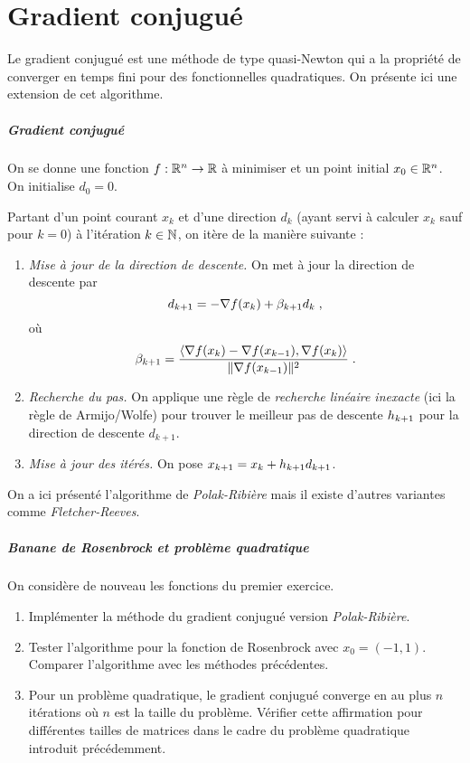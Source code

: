 \documentclass[a4paper,french,12pt]{article}
\begin{document}
\section{Gradient conjugué}
%
Le gradient conjugué est une méthode de type quasi-Newton qui a la
propriété de converger en temps fini pour des fonctionnelles
quadratiques. On présente ici une extension de cet algorithme.
\subparagraph{Gradient conjugué}
On se donne une fonction $f : \mathbb{R}^n \to \mathbb{R}$ à minimiser et un point initial $x_0 \in \mathbb{R}^n$. On initialise $d_0 = 0$.

Partant d'un point courant $x_k$ et d'une direction $d_k$ (ayant servi à  calculer $x_k$ sauf pour $k=0$) à
l'itération $k \in \mathbb{N}$, on itère de la manière suivante :
\begin{enumerate}
\item \textit{Mise à jour de la direction de descente.}  On met à jour la direction de descente par
  \begin{equation*}
    d_{k+1} = -\nabla f(x_k) + \beta_{k+1} d_k \;,
  \end{equation*}
  où
  \begin{equation*}
   \beta_{k+1} = \frac{\langle \nabla f(x_{k}) - \nabla f(x_{k-1}), \nabla f(x_{k}) \rangle}{\| \nabla f(x_{k-1}) \|^2}  \;.
  \end{equation*}
\item \textit{Recherche du pas.} On applique une règle de \textit{recherche linéaire inexacte} (ici la règle de Armijo/Wolfe) pour trouver le meilleur pas de descente $h_{k+1}$ pour la direction de descente $d_{k+1}$.
  \item \textit{Mise à jour des itérés.} On pose  $x_{k+1} = x_{k} + h_{k+1} d_{k+1}$.
  \end{enumerate}
  \begin{remarque}
    On a ici présenté l'algorithme de \textit{Polak-Ribière} mais il existe d'autres variantes comme \textit{Fletcher-Reeves}. 
  \end{remarque}

  \subparagraph{Banane de Rosenbrock et problème quadratique} On considère de nouveau les fonctions du premier exercice.

  \begin{enumerate}
  \item Implémenter la méthode du gradient conjugué version \textit{Polak-Ribière}.
    
  \item  Tester l'algorithme pour la fonction de Rosenbrock avec $x_0 = (-1,1)$. Comparer l'algorithme avec les méthodes précédentes.
    
  \item  Pour un problème quadratique, le gradient conjugué converge en au plus $n$ itérations où $n$ est la taille du problème. Vérifier cette affirmation pour différentes tailles de matrices dans le cadre du problème quadratique introduit précédemment.
  
  \end{enumerate}
  
\end{document}
